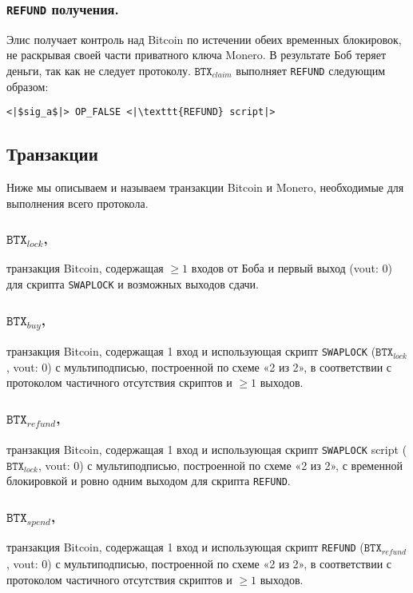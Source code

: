 \documentclass{llncs}
\newcommand{\BTX}{\texttt{BTX}}
\begin{document}
\subsubsection{\texttt{REFUND} получения.}
Элис получает контроль над Bitcoin по истечении обеих временных блокировок, не раскрывая своей части приватного ключа Monero. В результате Боб теряет деньги, так как не следует протоколу. $\BTX_\textit{claim}$ выполняет \texttt{REFUND} следующим образом:

\begin{verbatim}
<|$sig_a$|> OP_FALSE <|\texttt{REFUND} script|>
\end{verbatim}

\subsection{Транзакции}
Ниже мы описываем и называем транзакции Bitcoin и Monero, необходимые для выполнения всего протокола.

\subsubsection{$\BTX_\textit{lock}$,}
транзакция Bitcoin, содержащая $\geq 1$ входов от Боба и первый выход (vout: 0) для скрипта \texttt{SWAPLOCK} и возможных выходов сдачи.

\subsubsection{$\BTX_\textit{buy}$,}
транзакция Bitcoin, содержащая 1 вход и использующая скрипт \texttt{SWAPLOCK} ($\BTX_\textit{lock}$, vout: 0) с мультиподписью, построенной по схеме «2 из 2», в соответствии с протоколом частичного отсутствия скриптов и $\geq 1$ выходов.

\subsubsection{$\BTX_\textit{refund}$,}
транзакция Bitcoin, содержащая 1 вход и использующая скрипт \texttt{SWAPLOCK} script ($\BTX_\textit{lock}$, vout: 0) с мультиподписью, построенной по схеме «2 из 2», с временной блокировкой и ровно одним выходом для скрипта \texttt{REFUND}.

\subsubsection{$\BTX_\textit{spend}$,}
транзакция Bitcoin, содержащая 1 вход и использующая скрипт \texttt{REFUND} ($\BTX_\textit{refund}$, vout: 0) с мультиподписью, построенной по схеме «2 из 2», в соответствии с протоколом частичного отсутствия скриптов и $\geq 1$ выходов.
\end{document}
